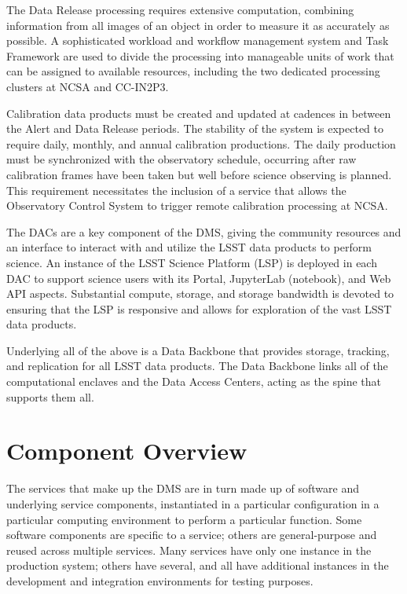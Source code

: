 \documentclass[DM,toc]{lsstdoc}
\begin{document}
The Data Release processing requires extensive computation, combining
information from all images of an object in order to measure it as
accurately as possible.  A sophisticated workload and workflow management
system and Task Framework are used to divide the processing into
manageable units of work that can be assigned to available resources,
including the two dedicated processing clusters at NCSA and CC-IN2P3.

Calibration data products must be created and updated at cadences in between
the Alert and Data Release periods.  The stability of the system is expected to
require daily, monthly, and annual calibration productions.  The daily
production must be synchronized with the observatory schedule, occurring after
raw calibration frames have been taken but well before science observing is
planned.  This requirement necessitates the inclusion of a service that allows
the Observatory Control System to trigger remote calibration processing at
NCSA.

The DACs are a key component of the DMS, giving the community resources and an
interface to interact with and utilize the LSST data products to perform
science.  An instance of the LSST Science Platform (LSP) is deployed in each
DAC to support science users with its Portal, JupyterLab (notebook), and Web
API aspects.  Substantial compute, storage, and storage bandwidth is devoted to
ensuring that the LSP is responsive and allows for exploration of the vast
LSST data products.

Underlying all of the above is a Data Backbone that provides storage, tracking,
and replication for all LSST data products.  The Data Backbone links all of the
computational enclaves and the Data Access Centers, acting as the spine that
supports them all.



\section{Component Overview}\label{component-overview}

The services that make up the DMS are in turn made up of software and
underlying service components, instantiated in a particular
configuration in a particular computing environment to perform a
particular function. Some software components are specific to a service;
others are general-purpose and reused across multiple services. Many
services have only one instance in the production system; others have
several, and all have additional instances in the development and
integration environments for testing purposes.
\end{document}
